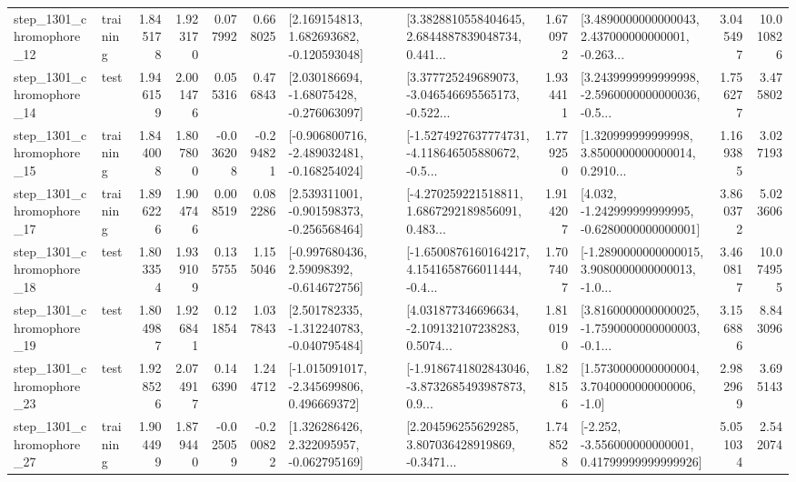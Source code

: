 \begin{tabular}{llrrrrllrlrr}
 step\_1301\_chromophore\_12 &  training &      1.845178 &    1.923170 &      0.077992 &  0.668025 &    [2.169154813, 1.682693682, -0.120593048] &  [3.3828810558404645, 2.6844887839048734, 0.441... &       1.670972 &  [3.4890000000000043, 2.437000000000001, -0.263... &            3.045497 &         10.010826 \\
 step\_1301\_chromophore\_14 &      test &      1.946159 &    2.001476 &      0.055316 &  0.476843 &    [2.030186694, -1.68075428, -0.276063097] &  [3.377725249689073, -3.046546695565173, -0.522... &       1.934411 &  [3.2439999999999998, -2.5960000000000036, -0.5... &            1.756277 &          3.475802 \\
 step\_1301\_chromophore\_15 &  training &      1.844008 &    1.807800 &     -0.036208 & -0.294821 &  [-0.906800716, -2.489032481, -0.168254024] &  [-1.5274927637774731, -4.118646505880672, -0.5... &       1.779250 &  [1.320999999999998, 3.8500000000000014, 0.2910... &            1.169385 &          3.027193 \\
 step\_1301\_chromophore\_17 &  training &      1.896226 &    1.904746 &      0.008519 &  0.082286 &   [2.539311001, -0.901598373, -0.256568464] &  [-4.270259221518811, 1.6867292189856091, 0.483... &       1.914207 &   [4.032, -1.242999999999995, -0.6280000000000001] &            3.860372 &          5.023606 \\
 step\_1301\_chromophore\_18 &      test &      1.803354 &    1.939109 &      0.135755 &  1.155046 &    [-0.997680436, 2.59098392, -0.614672756] &  [-1.6500876160164217, 4.1541658766011444, -0.4... &       1.707407 &  [-1.2890000000000015, 3.9080000000000013, -1.0... &            3.460817 &         10.074955 \\
 step\_1301\_chromophore\_19 &      test &      1.804987 &    1.926841 &      0.121854 &  1.037843 &   [2.501782335, -1.312240783, -0.040795484] &  [4.031877346696634, -2.109132107238283, 0.5074... &       1.810190 &  [3.8160000000000025, -1.7590000000000003, -0.1... &            3.156886 &          8.843096 \\
 step\_1301\_chromophore\_23 &      test &      1.928526 &    2.074917 &      0.146390 &  1.244712 &   [-1.015091017, -2.345699806, 0.496669372] &  [-1.9186741802843046, -3.8732685493987873, 0.9... &       1.828156 &     [1.5730000000000004, 3.7040000000000006, -1.0] &            2.982969 &          3.695143 \\
 step\_1301\_chromophore\_27 &  training &      1.904499 &    1.879440 &     -0.025059 & -0.200822 &    [1.326286426, 2.322095957, -0.062795169] &  [2.204596255629285, 3.807036428919869, -0.3471... &       1.748528 &  [-2.252, -3.556000000000001, 0.41799999999999926] &            5.051034 &          2.542074 \\

\end{tabular}
